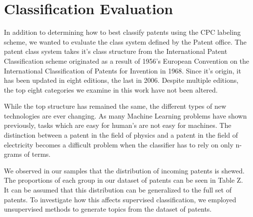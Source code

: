 \section{Classification Evaluation}
In addition to determining how to best classify patents using the CPC labeling scheme, we wanted to evaluate the class system defined by the Patent office.  The patent class system takes it's class structure from the International Patent Classification scheme originated as a result of 1956's European Convention on the International Classification of Patents for Invention in 1968.  Since it's origin, it has been updated in eight editions, the last in 2006.  Despite multiple editions, the top eight categories we examine in this work have not been altered.
  
While the top structure has remained the same, the different types of new technologies are ever changing.  
As many Machine Learning problems have shown previously, tasks which are easy for human's are not easy for machines.  The distinction between a patent in the field of physics and a patent in the field of electricity becomes a difficult problem when the classifier has to rely on only n-grams of terms. 

We observed in our samples that the distribution of incoming patents is shewed.  The proportions of each group in our dataset of patents can be seen in Table Z.  It can be assumed that this distribution can be generalized to the full set of patents.  To investigate how this affects supervised classification, we employed unsupervised methods to generate topics from the dataset of patents.  

 
